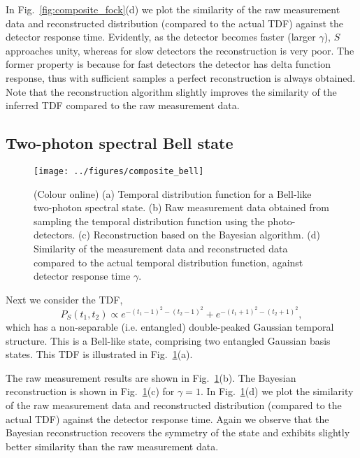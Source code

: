 \documentclass[aps,pra,twocolumn,amsmath,amssymb,color,superscriptaddress]{revtex4}
\begin{document}
In Fig.~\ref{fig:composite_fock}(d) we plot the similarity of the raw measurement data and reconstructed distribution (compared to the actual TDF) against the detector response time. Evidently, as the detector becomes faster (larger $\gamma$), $S$ approaches unity, whereas for slow detectors the reconstruction is very poor. The former property is because for fast detectors the detector has delta function response, thus with sufficient samples a perfect reconstruction is always obtained. Note that the reconstruction algorithm slightly improves the similarity of the inferred TDF compared to the raw measurement data.

%
%

\subsection{Two-photon spectral Bell state}

\begin{figure}[!htb]
\texttt{[image: ../figures/composite\_bell]}
\caption{(Colour online) (a) Temporal distribution function for a Bell-like two-photon spectral state. (b) Raw measurement data obtained from sampling the temporal distribution function using the photo-detectors. (c) Reconstruction based on the Bayesian algorithm. (d) Similarity of the measurement data and reconstructed data compared to the actual temporal distribution function, against detector response time $\gamma$.} \label{fig:composite_bell}
\end{figure}

Next we consider the TDF,
\begin{equation} \label{eq:spectral_gaussian}
P_S(t_{1}, t_{2}) \propto e^{-(t_{1}-1)^{2}-(t_{2}-1)^{2}} + e^{-(t_{1}+1)^{2}-(t_{2}+1)^{2}},
\end{equation}
which has a non-separable (i.e. entangled) double-peaked Gaussian temporal structure. This is a Bell-like state, comprising two entangled Gaussian basis states. This TDF is illustrated in Fig.~\ref{fig:composite_bell}(a).

The raw measurement results are shown in Fig.~\ref{fig:composite_bell}(b). The Bayesian reconstruction is shown in Fig.~\ref{fig:composite_bell}(c) for \mbox{$\gamma=1$}.  In Fig.~\ref{fig:composite_bell}(d) we plot the similarity of the raw measurement data and reconstructed distribution (compared to the actual TDF) against the detector response time. Again we observe that the Bayesian reconstruction recovers the symmetry of the state and exhibits slightly better similarity than the raw measurement data.
\end{document}
